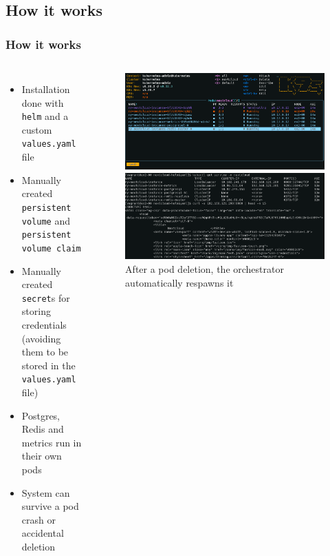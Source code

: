 \documentclass{beamer}
\let\oldtexttt\texttt
\renewcommand{\texttt}[1]{\textcolor{textttcolor}{\oldtexttt{#1}}}
\begin{document}
\subsection{How it works}
\begin{frame}
    \frametitle{How it works}
    \begin{columns}
        \begin{itemize}
            \item Installation done with \texttt{helm} and a custom \texttt{values.yaml} file
            \item Manually created \texttt{persistent volume} and \texttt{persistent volume claim}
            \item Manually created \texttt{secret}s for storing credentials (avoiding them to be stored in the \texttt{values.yaml} file)
            \item Postgres, Redis and metrics run in their own pods
            \item System can survive a pod crash or accidental deletion  
        \end{itemize}
        \begin{figure}
            \includegraphics[width=\textwidth]{images/other/pod-deletion}
            \caption*{After a pod deletion, the orchestrator automatically respawns it}
            \includegraphics[width=\textwidth]{images/other/terminal-access}
        \end{figure}
    \end{columns}
\end{frame}
\end{document}
